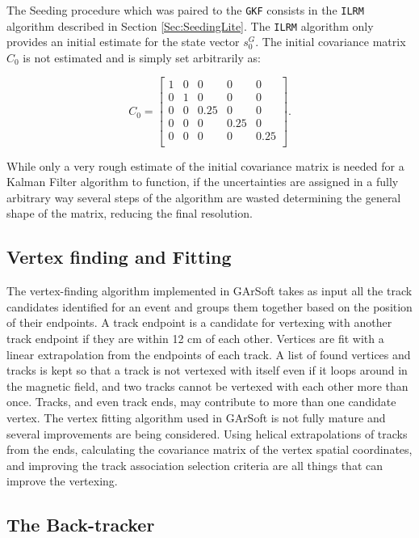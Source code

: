 The Seeding procedure which was paired to the \texttt{GKF} consists in the \texttt{ILRM} algorithm described in Section \ref{Sec:SeedingLite}. The \texttt{ILRM} algorithm only provides an initial estimate for the state vector $s_0^G$. The initial covariance matrix $C_0$ is not estimated and is simply set arbitrarily as:

\begin{equation}
    \label{eq:C0}
    C_0 =\begin{bmatrix}
    1 & 0 & 0 & 0& 0 \\
    0 & 1 & 0 & 0& 0 \\
    0 & 0 & 0.25 & 0& 0 \\
    0 & 0 & 0 & 0.25& 0 \\
    0 & 0 & 0 & 0& 0.25 \\
    \end{bmatrix} .
\end{equation}

While only a very rough estimate of the initial covariance matrix is needed for a Kalman Filter algorithm to function, if the uncertainties are assigned in a fully arbitrary way several steps of the algorithm are wasted determining the general shape of the matrix, reducing the final resolution. 

\subsection{Vertex finding and Fitting}
\label{Sec: Vertexing}
The vertex-finding algorithm implemented in GArSoft takes as input all the track candidates identified for an event and groups them together based on the position of their endpoints.  A track endpoint is a candidate for vertexing with another track endpoint if they are within 12 cm of each other. Vertices are fit with a linear extrapolation from the endpoints of each track. A list of found vertices and tracks is kept so that a track is not vertexed with itself even if it loops around in the magnetic field, and two tracks cannot be vertexed with each other more than once. Tracks, and even track ends, may contribute to more than one candidate vertex.
The vertex fitting algorithm used in GArSoft is not fully mature and several improvements are being considered. Using helical extrapolations of tracks from the ends, calculating the covariance matrix of the vertex spatial coordinates, and improving the track association selection criteria are all
things that can improve the vertexing.

\subsection{The Back-tracker}
\label{Sec:GArSoft_Back}

